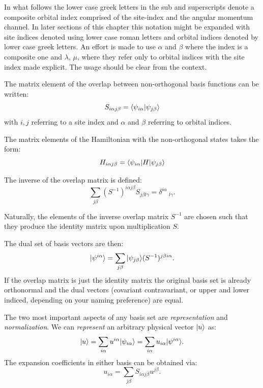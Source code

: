 In what follows the lower case greek letters in the sub and superscripts
denote a composite orbital index comprised of the site-index and the 
angular momentum channel. In later sections of this chapter this notation
might be expanded with site indices denoted using lower case
roman letters and orbital indices denoted by lower case greek letters.
An effort is made to use $\alpha$ and $\beta$ where the index is a composite
one and $\lambda$, $\mu$, where they refer only to orbital indices with the 
site index made explicit. The usage should be clear from the context.

The matrix element of the overlap between non-orthogonal 
basis functions can be written:
%
\begin{equation}
S_{i\alpha j\beta} = \langle \psi_{i\alpha}|\psi_{j\beta}\rangle
\end{equation}
%
with $i,j$ referring to a site index and $\alpha$ and $\beta$ 
referring to orbital indices.

The matrix elements of the Hamiltonian with the non-orthogonal states takes
the form:
%
\begin{equation}
H_{i\alpha j\beta} = \langle \psi_{i\alpha}|H|\psi_{j\beta}\rangle
\end{equation}

The inverse of the overlap matrix is defined:
%
\begin{equation}
\sum_{j\beta}(S^{-1})^{i\alpha j\beta}S_{j\beta l\gamma}=\delta^{i\alpha}\ _{l\gamma}.
\end{equation}
%

Naturally, the elements of the inverse overlap matrix $S^{-1}$ are chosen 
such that they produce the identity matrix upon multiplication $S$.

The dual set of basis vectors are then:
%
\begin{equation}
|\psi^{i\alpha}\rangle = \sum_{j\beta}|\psi_{j\beta}\rangle(S^{-1})^{j\beta i\alpha}.
\end{equation}
%
If the overlap matrix is just the identity matrix the original 
basis set is already orthonormal and the dual vectors (covariant
contravariant, or upper and lower indiced, depending
on your naming preference) are equal.

The two most important aspects of any basis set
are {\it representation} and {\it normalization}. 
We can {\it represent} an arbitrary physical 
vector $|u\rangle$ as:
%
\begin{equation}
|u\rangle = \sum_{i\alpha}u^{i\alpha}|\psi_{i\alpha}\rangle = \sum_{i\alpha}u_{i\alpha}|\psi^{i\alpha}\rangle.
\end{equation}
%
The expansion coefficients in either basis can be obtained via:
%
\begin{equation}
u_{i\alpha} = \sum_{j\beta}S_{i\alpha j\beta}u^{j\beta}.
\end{equation}
%

